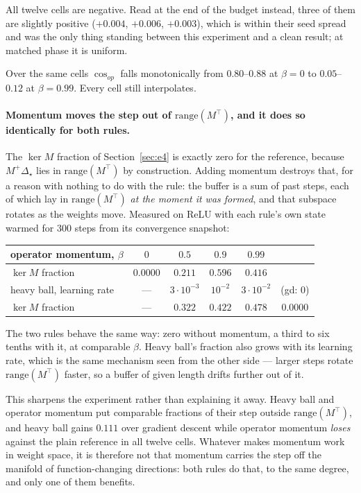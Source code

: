 \documentclass{article} %
\theoremstyle{plain}
\theoremstyle{definition}
\theoremstyle{remark}
\begin{document}
\noindent All twelve cells are negative. Read at the end of the budget instead, three of them are
slightly positive ($+0.004$, $+0.006$, $+0.003$), which is within their seed spread and was the
only thing standing between this experiment and a clean result; at matched phase it is uniform.

\noindent Over the same cells $\cos_{op}$ falls monotonically from $0.80$--$0.88$ at $\beta = 0$ to
$0.05$--$0.12$ at $\beta = 0.99$. Every cell still interpolates.

\paragraph{Momentum moves the step out of $\mathrm{range}(M^\top)$, and it does so identically for
both rules.} The $\ker M$ fraction of Section~\ref{sec:e4} is exactly zero for the reference,
because $M^{+}\Delta_\star$ lies in $\mathrm{range}(M^\top)$ by construction. Adding momentum
destroys that, for a reason with nothing to do with the rule: the buffer is a sum of past steps,
each of which lay in $\mathrm{range}(M^\top)$ \emph{at the moment it was formed}, and that subspace
rotates as the weights move. Measured on ReLU with each rule's own state warmed for $300$ steps
from its convergence snapshot:

\begin{center}\small
\begin{tabular}{lccccc}
\toprule
operator momentum, $\beta$ & $0$ & $0.5$ & $0.9$ & $0.99$ & \\
\midrule
$\ker M$ fraction & $0.0000$ & $0.211$ & $0.596$ & $0.416$ & \\
\midrule
heavy ball, learning rate & --- & $3\cdot10^{-3}$ & $10^{-2}$ & $3\cdot10^{-2}$ & (gd: $0$) \\
\midrule
$\ker M$ fraction & --- & $0.322$ & $0.422$ & $0.478$ & $0.0000$ \\
\bottomrule
\end{tabular}
\end{center}

\noindent The two rules behave the same way: zero without momentum, a third to six tenths with it,
at comparable $\beta$. Heavy ball's fraction also grows with its learning rate, which is the same
mechanism seen from the other side --- larger steps rotate $\mathrm{range}(M^\top)$ faster, so a
buffer of given length drifts further out of it.

This sharpens the experiment rather than explaining it away. Heavy ball and operator momentum put
comparable fractions of their step outside $\mathrm{range}(M^\top)$, and heavy ball gains $0.111$
over gradient descent while operator momentum \emph{loses} against the plain reference in all
twelve cells. Whatever makes momentum work in weight space, it is therefore not that momentum
carries the step off the manifold of function-changing directions: both rules do that, to the same
degree, and only one of them benefits.
\end{document}

